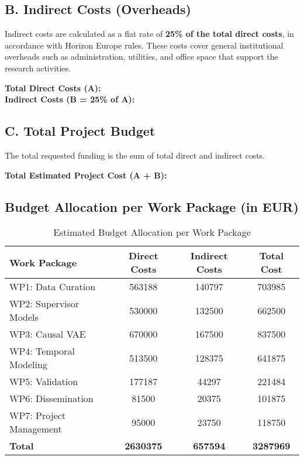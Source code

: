 \subsection*{B. Indirect Costs (Overheads)}
Indirect costs are calculated as a flat rate of \textbf{25\% of the total direct costs}, in accordance with Horizon Europe rules. These costs cover general institutional overheads such as administration, utilities, and office space that support the research activities.

\textbf{Total Direct Costs (A): } \\
\textbf{Indirect Costs (B = 25\% of A): }

\subsection*{C. Total Project Budget}
The total requested funding is the sum of total direct and indirect costs.

\textbf{Total Estimated Project Cost (A + B): }

\subsection*{Budget Allocation per Work Package (in EUR)}

\begin{table}[H]
\centering
\caption{Estimated Budget Allocation per Work Package}
\label{tab:budget_wp}
\begin{tabular}{lS[table-format=7.0]S[table-format=7.0]S[table-format=7.0]}
\toprule
\textbf{Work Package} & \textbf{Direct Costs} & \textbf{Indirect Costs} & \textbf{Total Cost} \\
\midrule
WP1: Data Curation & 563188 & 140797 & 703985 \\
WP2: Supervisor Models & 530000 & 132500 & 662500 \\
WP3: Causal VAE & 670000 & 167500 & 837500 \\
WP4: Temporal Modeling & 513500 & 128375 & 641875 \\
WP5: Validation & 177187 & 44297 & 221484 \\
WP6: Dissemination & 81500 & 20375 & 101875 \\
WP7: Project Management & 95000 & 23750 & 118750 \\
\midrule
\textbf{Total} & \textbf{2630375} & \textbf{657594} & \textbf{3287969} \\
\bottomrule
\end{tabular}
\end{table}